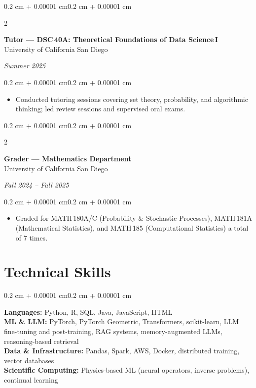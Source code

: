 \documentclass[10pt, letterpaper]{article}
\newenvironment{highlights}{
    \begin{itemize}[
        topsep=0.10 cm,
        parsep=0.10 cm,
        partopsep=0pt,
        itemsep=0pt,
        leftmargin=0.4 cm + 10pt
    ]
}{\end{itemize}}
\newenvironment{onecolentry}{
    \begin{adjustwidth}{0.2 cm + 0.00001 cm}{0.2 cm + 0.00001 cm}
}{\end{adjustwidth}}
\newenvironment{twocolentry}[2][]{
    \onecolentry
    \def\secondColumn{#2}
    \setcolumnwidth{\fill, 4.5 cm}
    \begin{paracol}{2}
}{
    \switchcolumn \raggedleft \secondColumn
    \end{paracol}
    \endonecolentry
}
\begin{document}
    \begin{twocolentry}{\textit{Summer 2025}}
        \textbf{Tutor — DSC\,40A: Theoretical Foundations of Data Science\,I}\\
        University of California San Diego
    \end{twocolentry}

    \vspace{0.10 cm}
    \begin{onecolentry}
        \begin{highlights}
            \item Conducted tutoring sessions covering set theory, probability, and algorithmic thinking; led review sessions and supervised oral exams.
        \end{highlights}
    \end{onecolentry}

    \vspace{0.15 cm}

    \begin{twocolentry}{\textit{Fall 2024 -- Fall 2025}}
        \textbf{Grader — Mathematics Department}\\
        University of California San Diego
    \end{twocolentry}

    \vspace{0.10 cm}
    \begin{onecolentry}
        \begin{highlights}
            \item Graded for MATH\,180A/C (Probability \& Stochastic Processes), MATH\,181A (Mathematical Statistics), and MATH\,185 (Computational Statistics) a total of 7 times.
        \end{highlights}
    \end{onecolentry}

    \section{Technical Skills}

    \begin{onecolentry}
        \textbf{Languages:} Python, R, SQL, Java, JavaScript, HTML\\[3pt]
        \textbf{ML \& LLM:} PyTorch, PyTorch Geometric, Transformers, scikit-learn, LLM fine-tuning and post-training, RAG systems, memory-augmented LLMs, reasoning-based retrieval\\[3pt]
        \textbf{Data \& Infrastructure:} Pandas, Spark, AWS, Docker, distributed training, vector databases\\[3pt]
        \textbf{Scientific Computing:} Physics-based ML (neural operators, inverse problems), continual learning
    \end{onecolentry}
\end{document}
